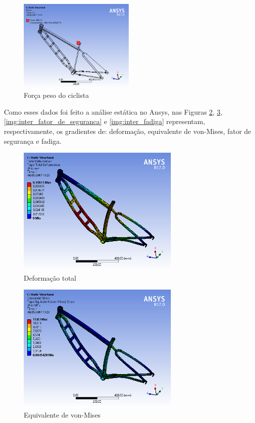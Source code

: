 	\begin{figure}[H]
		\centering
		\includegraphics[width=0.5\textwidth]{inter_F900.png}
		\caption{Força peso do ciclista}
		\label{img:inter_F900}
	\end{figure}
	
	Como esses dados foi feito a análise estática no Ansys, nas Figuras \ref{img:inter_deformacao_total}, \ref{img:inter_von-Mises}, \ref{img:inter_fator_de_seguranca} e \ref{img:inter_fadiga} representam, respectivamente, os gradientes de: deformação, equivalente de von-Mises, fator de segurança e fadiga.
	
	\begin{figure}[!htb]
		\centering
		\includegraphics[width=0.7\textwidth]{inter_deformacao_total.png}
		\caption{Deformação total}
		\label{img:inter_deformacao_total}
	\end{figure}
	
	\newpage
	\begin{figure}[!htb]
		\centering
		\includegraphics[width=0.7\textwidth]{inter_von-Mises.png}
		\caption{Equivalente de von-Mises}
		\label{img:inter_von-Mises}
	\end{figure}
	
